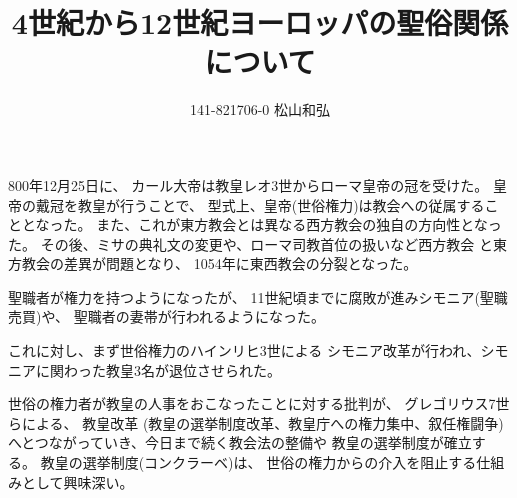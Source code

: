 \documentclass{jsarticle}
\begin{document}
\title{4世紀から12世紀ヨーロッパの聖俗関係について}
\author{141-821706-0 松山和弘}
\maketitle

800年12月25日に、
カール大帝は教皇レオ3世からローマ皇帝の冠を受けた。
皇帝の戴冠を教皇が行うことで、
型式上、皇帝(世俗権力)は教会への従属することとなった。
また、これが東方教会とは異なる西方教会の独自の方向性となった。
その後、ミサの典礼文の変更や、ローマ司教首位の扱いなど西方教会
と東方教会の差異が問題となり、
1054年に東西教会の分裂となった。

聖職者が権力を持つようになったが、
11世紀頃までに腐敗が進みシモニア(聖職売買)や、
聖職者の妻帯が行われるようになった。

これに対し、まず世俗権力のハインリヒ3世による
シモニア改革が行われ、シモニアに関わった教皇3名が退位させられた。

世俗の権力者が教皇の人事をおこなったことに対する批判が、
グレゴリウス7世らによる、
教皇改革 (教皇の選挙制度改革、教皇庁への権力集中、叙任権闘争) 
へとつながっていき、今日まで続く教会法の整備や
教皇の選挙制度が確立する。
教皇の選挙制度(コンクラーベ)は、
世俗の権力からの介入を阻止する仕組みとして興味深い。
\end{document}
